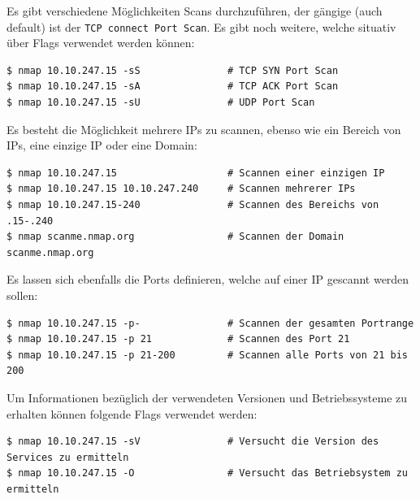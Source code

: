 Es gibt verschiedene Möglichkeiten Scans durchzuführen, der gängige
(auch default) ist der \texttt{TCP\ connect\ Port\ Scan}. Es gibt noch
weitere, welche situativ über Flags verwendet werden können:

\begin{verbatim}
$ nmap 10.10.247.15 -sS               # TCP SYN Port Scan
$ nmap 10.10.247.15 -sA               # TCP ACK Port Scan
$ nmap 10.10.247.15 -sU               # UDP Port Scan
\end{verbatim}

Es besteht die Möglichkeit mehrere IPs zu scannen, ebenso wie ein
Bereich von IPs, eine einzige IP oder eine Domain:

\begin{verbatim}
$ nmap 10.10.247.15                   # Scannen einer einzigen IP
$ nmap 10.10.247.15 10.10.247.240     # Scannen mehrerer IPs
$ nmap 10.10.247.15-240               # Scannen des Bereichs von .15-.240
$ nmap scanme.nmap.org                # Scannen der Domain scanme.nmap.org
\end{verbatim}

Es lassen sich ebenfalls die Ports definieren, welche auf einer IP
gescannt werden sollen:

\begin{verbatim}
$ nmap 10.10.247.15 -p-               # Scannen der gesamten Portrange
$ nmap 10.10.247.15 -p 21             # Scannen des Port 21
$ nmap 10.10.247.15 -p 21-200         # Scannen alle Ports von 21 bis 200
\end{verbatim}

Um Informationen bezüglich der verwendeten Versionen und Betriebssysteme
zu erhalten können folgende Flags verwendet werden:

\begin{verbatim}
$ nmap 10.10.247.15 -sV               # Versucht die Version des Services zu ermitteln
$ nmap 10.10.247.15 -O                # Versucht das Betriebsystem zu ermitteln
\end{verbatim}

